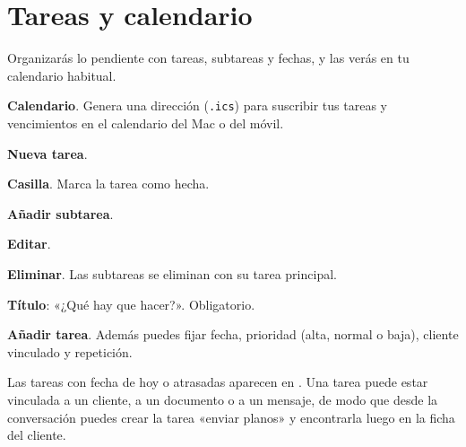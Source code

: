 \chapter{Tareas y calendario}\label{cap:tareas}

\begin{objbox}
Organizarás lo pendiente con tareas, subtareas y fechas, y las verás en tu calendario habitual.
\end{objbox}

\begin{leyenda}
\item[\mk{1}] \textbf{Calendario}. Genera una dirección (\texttt{.ics}) para suscribir tus tareas y vencimientos en el calendario del Mac o del móvil.
\item[\mk{2}] \textbf{Nueva tarea}.
\item[\mk{3}] \textbf{Casilla}. Marca la tarea como hecha.
\item[\mk{4}] \textbf{Añadir subtarea}.
\item[\mk{5}] \textbf{Editar}.
\item[\mk{6}] \textbf{Eliminar}. Las subtareas se eliminan con su tarea principal.
\end{leyenda}

\begin{leyenda}
\item[\mk{1}] \textbf{Título}: «¿Qué hay que hacer?». Obligatorio.
\item[\mk{2}] \textbf{Añadir tarea}. Además puedes fijar fecha, prioridad (alta, normal o baja), cliente vinculado y repetición.
\end{leyenda}
Las tareas con fecha de hoy o atrasadas aparecen en . Una tarea puede estar vinculada a un cliente, a un documento o a un mensaje, de modo que desde la conversación puedes crear la tarea «enviar planos» y encontrarla luego en la ficha del cliente.
